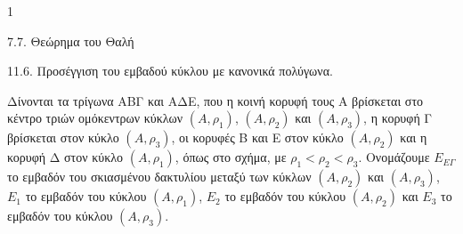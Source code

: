 \begin{ylh}{1}
    \item 7.7. Θεώρημα του Θαλή
    \item 11.6. Προσέγγιση του εμβαδού κύκλου με κανονικά πολύγωνα.
\end{ylh}
\begin{figure} %
    \centering
\end{figure}
Δίνονται τα τρίγωνα ΑΒΓ και ΑΔΕ, που η κοινή κορυφή τους Α βρίσκεται στο κέντρο τριών ομόκεντρων κύκλων $(A, \rho_1)$, $(A, \rho_2)$ και $(A, \rho_3)$, η κορυφή Γ βρίσκεται στον κύκλο $(A, \rho_3)$, οι κορυφές Β και Ε στον κύκλο $(A, \rho_2)$ και η κορυφή Δ στον κύκλο $(A, \rho_1)$, όπως στο σχήμα, με $\rho_1 < \rho_2 < \rho_3$. Ονομάζουμε $E_{ΕΓ}$ το εμβαδόν του σκιασμένου δακτυλίου μεταξύ των κύκλων $(A, \rho_2)$ και $(A, \rho_3)$, $E_1$ το εμβαδόν του κύκλου $(A, \rho_1)$, $E_2$ το εμβαδόν του κύκλου $(A, \rho_2)$ και $E_3$ το εμβαδόν του κύκλου $(A, \rho_3)$.
